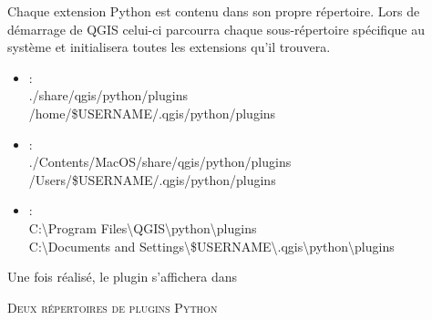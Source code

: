 Chaque extension Python est contenu dans son propre répertoire. Lors de démarrage
de QGIS celui-ci parcourra chaque sous-répertoire spécifique au système et
initialisera toutes les extensions qu'il trouvera.

\begin{itemize}
\item {} : \\
./share/qgis/python/plugins \\
/home/\$USERNAME/.qgis/python/plugins
\item {}:\\
./Contents/MacOS/share/qgis/python/plugins \\
/Users/\$USERNAME/.qgis/python/plugins
\item {}:\\
C:\textbackslash Program Files\textbackslash QGIS\textbackslash python\textbackslash plugins \\
C:\textbackslash Documents and Settings\textbackslash\$USERNAME\textbackslash .qgis\textbackslash python\textbackslash plugins

\end{itemize}

Une fois réalisé, le plugin s'affichera dans

\begin{Tip}\caption{\textsc{Deux répertoires de plugins Python}}
\end{Tip}

